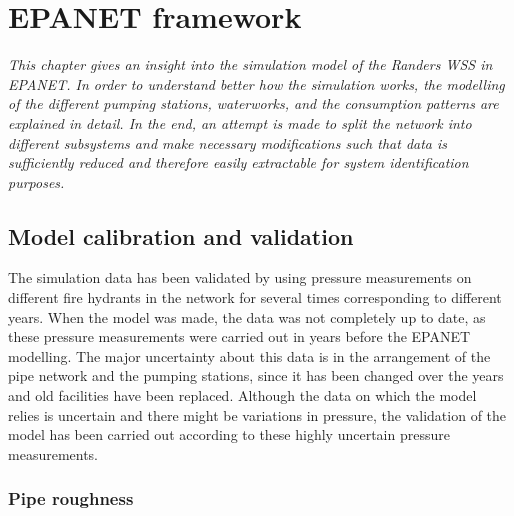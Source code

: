 \chapter{EPANET framework}
\label{epanet_framework_appendix}

\emph{This chapter gives an insight into the simulation model of the Randers WSS in EPANET. In order to understand better how the simulation works, the modelling of the different pumping stations, waterworks, and the consumption patterns are explained in detail. In the end, an attempt is made to split the network into different subsystems and make necessary modifications such that data is sufficiently reduced and therefore easily extractable for system identification purposes.}




\section{Model calibration and validation}
\label{model_calibration_and_validation}

The simulation data has been validated by using pressure measurements on different fire hydrants in the network for several times corresponding to different years. When the model was made, the data was not completely up to date, as these pressure measurements were carried out in years before the EPANET modelling. The major uncertainty about this data is in the arrangement of the pipe network and the pumping stations, since it has been changed over the years and old facilities have been replaced. Although the data on which the model relies is uncertain and there might be variations in pressure, the validation of the model has been carried out according to these highly uncertain pressure measurements. 

\subsection{Pipe roughness}
\label{pipe_roughness}

